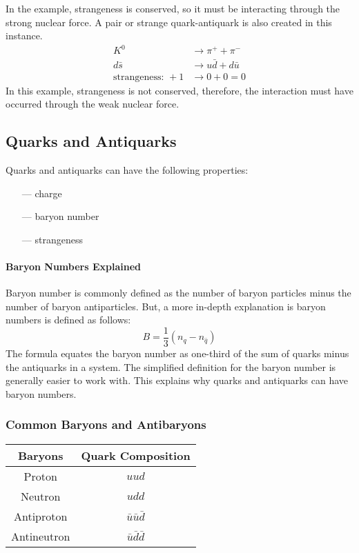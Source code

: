 \documentclass[10pt]{article}
\makeatletter
\newenvironment{tablehere}
  {\def\@captype{table}}
  {}
\makeatother
\begin{document}
\begin{multicols*}{2}
	In the example, strangeness is conserved, so it must be interacting through the
	strong nuclear force. A pair or strange quark-antiquark is also created in this
	instance.
	\begin{align*}
		K^0                     & \longrightarrow \pi^+ + \pi^-       \\
		d\bar{s}                & \longrightarrow u\bar{d} + d\bar{u} \\
		\text{strangeness: } +1 & \longrightarrow 0 + 0 = 0
	\end{align*}
	In this example, strangeness is not conserved, therefore, the interaction must
	have occurred through the weak nuclear force.

	\subsection{Quarks and Antiquarks}
	Quarks and antiquarks can have the following properties:
	\medskip
	\begin{itemize}
		\item[---] charge
		\item[---] baryon number
		\item[---] strangeness
	\end{itemize}
	\paragraph{Baryon Numbers Explained}
	Baryon number is commonly defined as the number of baryon particles minus the
	number of baryon antiparticles. But, a more in-depth explanation is baryon
	numbers is defined as follows:
	\begin{equation}
		B = \dfrac{1}{3}(n_q - n_{\bar{q}})
	\end{equation}
	The formula equates the baryon number as one-third of the sum of quarks minus
	the antiquarks in a system. The simplified definition for the baryon number is
	generally easier to work with. This explains why quarks and antiquarks can have
	baryon numbers.

	\subsubsection{Common Baryons and Antibaryons}
	\begin{center}
		\begin{tablehere}
			\begin{tabular}{|c|c|}
				\hline
				Baryons     & Quark Composition       \\
				\hline
				Proton      & $uud$                   \\
				Neutron     & $udd$                   \\
				Antiproton  & $\bar{u}\bar{u}\bar{d}$ \\
				Antineutron & $\bar{u}\bar{d}\bar{d}$ \\
				\hline
			\end{tabular}
		\end{tablehere}
	\end{center}


\end{multicols*}
\end{document}
